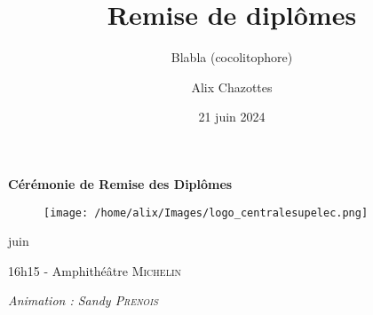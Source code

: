 \documentclass{beamer}
\title[Remise de diplômes]{Remise de diplômes}
\subtitle{Blabla (cocolitophore)}
\author{Alix Chazottes}
\institute{CentraleSupélec}
\date{21 juin 2024}
\begin{document}
\begin{frame}[plain]
  \begin{center}
    \vspace*{0.5cm}
    {\Large \textbf{Cérémonie de Remise des Diplômes}} \\
    \vspace*{0.3cm}
    {\large 
    \begin{figure}
      \texttt{[image: /home/alix/Images/logo\_centralesupelec.png]}
    \end{figure}
    
    \vspace*{0.5cm}
     juin  \\
    }
    
    \vspace*{0.3cm}
    16h15 - Amphithéâtre \textsc{Michelin} \\
    \vspace*{0.7cm}
    
    \textit{ Animation : Sandy \textsc{Prenois}}
  \end{center}

\end{frame}


\end{document}
